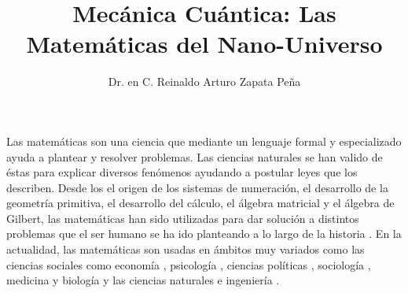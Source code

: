 \documentclass[twocolumn]{article}
\title{Mecánica Cuántica: Las Matemáticas del Nano-Universo}
\author{Dr. en C. Reinaldo Arturo Zapata Peña}
\date{}
\begin{document}
\maketitle

Las matemáticas son una ciencia que mediante un lenguaje formal y especializado
ayuda a plantear y resolver problemas. Las ciencias naturales se han valido de
éstas para explicar diversos fenómenos ayudando a postular leyes que los
describen. Desde los el origen de los sistemas de numeración, el desarrollo de
la geometría primitiva, el desarrollo del cálculo, el álgebra matricial y el
álgebra de Gilbert, las matemáticas han sido utilizadas para dar solución a
distintos problemas que el ser humano se ha ido planteando a lo largo de la
historia \cite{boyer2011history}. En la actualidad, las matemáticas son usadas
en ámbitos muy variados como las ciencias sociales como economía
\cite{blavatskyy18MSC, lindsay17GEB, yokote17GEB}, psicología \cite{liu18BJMSP,
kang18BJMSP}, ciencias políticas \cite{moberg12MSS}, sociología
\cite{gokhan18JMS}, medicina y biología \cite{anderson05MMB, bokes18MMB,
brinks15MMB, korobeinikov05MMB, mcginty15MMB, taylorking18MMB, lo17IEEETBCS} y
las ciencias naturales e ingeniería \cite{zapata16PSSB, shkrebti17AST,
zapata17PRB, dzvonkovskaya18IEEEAESM, chou18IEEETAP, beres16IEEEJESTPE,
xie17IEEEPJ, demitras18IEEEJSTQE}.
\end{document}
